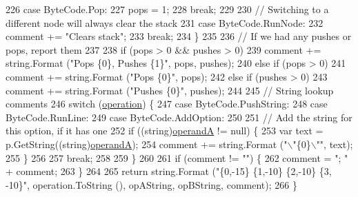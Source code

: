 \begin{DoxyCode}
226             \textcolor{keywordflow}{case} ByteCode.Pop:
227                 pops = 1;
228                 \textcolor{keywordflow}{break};
229             
230             \textcolor{comment}{// Switching to a different node will always clear the stack}
231             \textcolor{keywordflow}{case} ByteCode.RunNode:
232                 comment += \textcolor{stringliteral}{"Clears stack"};
233                 \textcolor{keywordflow}{break};
234             \}
235 
236             \textcolor{comment}{// If we had any pushes or pops, report them}
237 
238             \textcolor{keywordflow}{if} (pops > 0 && pushes > 0)
239                 comment += string.Format (\textcolor{stringliteral}{"Pops \{0\}, Pushes \{1\}"}, pops, pushes);
240             \textcolor{keywordflow}{else} \textcolor{keywordflow}{if} (pops > 0)
241                 comment += string.Format (\textcolor{stringliteral}{"Pops \{0\}"}, pops);
242             \textcolor{keywordflow}{else} \textcolor{keywordflow}{if} (pushes > 0)
243                 comment += string.Format (\textcolor{stringliteral}{"Pushes \{0\}"}, pushes);
244 
245             \textcolor{comment}{// String lookup comments}
246             \textcolor{keywordflow}{switch} (\hyperlink{a00093_a566bf5f7198cc353ea5c3710cb3a31cb}{operation}) \{
247             \textcolor{keywordflow}{case} ByteCode.PushString:
248             \textcolor{keywordflow}{case} ByteCode.RunLine:
249             \textcolor{keywordflow}{case} ByteCode.AddOption:
250 
251                 \textcolor{comment}{// Add the string for this option, if it has one}
252                 \textcolor{keywordflow}{if} ((\textcolor{keywordtype}{string})\hyperlink{a00093_ab5d386faa0d3dbc23db80f8e62706afd}{operandA} != null) \{
253                     var text = p.GetString((string)\hyperlink{a00093_ab5d386faa0d3dbc23db80f8e62706afd}{operandA});
254                     comment += string.Format (\textcolor{stringliteral}{"\(\backslash\)"\{0\}\(\backslash\)""}, text);
255                 \}
256 
257                 \textcolor{keywordflow}{break};
258             
259             \}
260 
261             \textcolor{keywordflow}{if} (comment != \textcolor{stringliteral}{""}) \{
262                 comment = \textcolor{stringliteral}{"; "} + comment;
263             \}
264 
265             \textcolor{keywordflow}{return} string.Format (\textcolor{stringliteral}{"\{0,-15\} \{1,-10\} \{2,-10\} \{3, -10\}"}, operation.ToString (), opAString, 
      opBString, comment);
266         \}
\end{DoxyCode}


